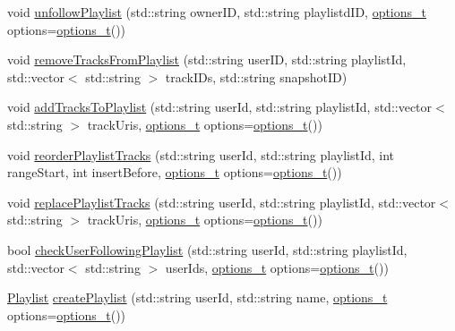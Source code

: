 \begin{DoxyCompactItemize}
\item 
void \mbox{\hyperlink{class_spotify_a_p_i_a1a89f73e8b0981a13970ed5788189a38}{unfollow\+Playlist}} (std\+::string owner\+ID, std\+::string playlistd\+ID, \mbox{\hyperlink{_spotify_a_p_i_8h_a0ff5cac1a4007bb330b7d9939650c283}{options\+\_\+t}} options=\mbox{\hyperlink{_spotify_a_p_i_8h_a0ff5cac1a4007bb330b7d9939650c283}{options\+\_\+t}}())
\item 
void \mbox{\hyperlink{class_spotify_a_p_i_ae1ce0b86c79df5f09a8d752dffd512ec}{remove\+Tracks\+From\+Playlist}} (std\+::string user\+ID, std\+::string playlist\+Id, std\+::vector$<$ std\+::string $>$ track\+I\+Ds, std\+::string snapshot\+ID)
\item 
void \mbox{\hyperlink{class_spotify_a_p_i_a045a3f9378e1fe18372e38ad58f86c91}{add\+Tracks\+To\+Playlist}} (std\+::string user\+Id, std\+::string playlist\+Id, std\+::vector$<$ std\+::string $>$ track\+Uris, \mbox{\hyperlink{_spotify_a_p_i_8h_a0ff5cac1a4007bb330b7d9939650c283}{options\+\_\+t}} options=\mbox{\hyperlink{_spotify_a_p_i_8h_a0ff5cac1a4007bb330b7d9939650c283}{options\+\_\+t}}())
\item 
void \mbox{\hyperlink{class_spotify_a_p_i_aa9fcff75e9b8067c482306f0af0fc519}{reorder\+Playlist\+Tracks}} (std\+::string user\+Id, std\+::string playlist\+Id, int range\+Start, int insert\+Before, \mbox{\hyperlink{_spotify_a_p_i_8h_a0ff5cac1a4007bb330b7d9939650c283}{options\+\_\+t}} options=\mbox{\hyperlink{_spotify_a_p_i_8h_a0ff5cac1a4007bb330b7d9939650c283}{options\+\_\+t}}())
\item 
void \mbox{\hyperlink{class_spotify_a_p_i_a5a5d099d9be138440ad095cf8d7e6a96}{replace\+Playlist\+Tracks}} (std\+::string user\+Id, std\+::string playlist\+Id, std\+::vector$<$ std\+::string $>$ track\+Uris, \mbox{\hyperlink{_spotify_a_p_i_8h_a0ff5cac1a4007bb330b7d9939650c283}{options\+\_\+t}} options=\mbox{\hyperlink{_spotify_a_p_i_8h_a0ff5cac1a4007bb330b7d9939650c283}{options\+\_\+t}}())
\item 
bool \mbox{\hyperlink{class_spotify_a_p_i_a7eb589d3b0696f9c9cf4a196cef1c627}{check\+User\+Following\+Playlist}} (std\+::string user\+Id, std\+::string playlist\+Id, std\+::vector$<$ std\+::string $>$ user\+Ids, \mbox{\hyperlink{_spotify_a_p_i_8h_a0ff5cac1a4007bb330b7d9939650c283}{options\+\_\+t}} options=\mbox{\hyperlink{_spotify_a_p_i_8h_a0ff5cac1a4007bb330b7d9939650c283}{options\+\_\+t}}())
\item 
\mbox{\hyperlink{class_playlist}{Playlist}} \mbox{\hyperlink{class_spotify_a_p_i_a1ac0dc243fd741bc5141b5cb275d5ff1}{create\+Playlist}} (std\+::string user\+Id, std\+::string name, \mbox{\hyperlink{_spotify_a_p_i_8h_a0ff5cac1a4007bb330b7d9939650c283}{options\+\_\+t}} options=\mbox{\hyperlink{_spotify_a_p_i_8h_a0ff5cac1a4007bb330b7d9939650c283}{options\+\_\+t}}())

\end{DoxyCompactItemize}
